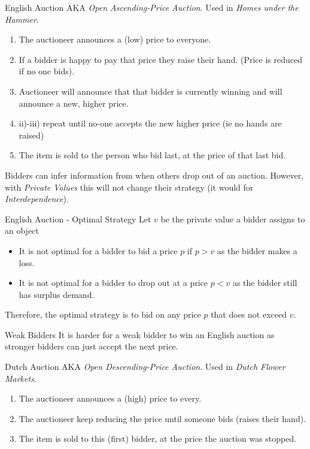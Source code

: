 \documentclass[11pt,a4paper]{article}
\begin{document}
\begin{definition}{English Auction}
  AKA \textit{Open Ascending-Price Auction}. Used in \textit{Homes under the Hammer}.
  \begin{enumerate}
    \item The auctioneer announces a (low) price to everyone.
    \item If a bidder is happy to pay that price they raise their hand. (Price is reduced if no one bids).
    \item Auctioneer will announce that that bidder is currently winning and will announce a new, higher price.
    \item ii)-iii) repeat until no-one accepts the new higher price (ie no hands are raised)
    \item The item is sold to the person who bid last, at the price of that last bid.
  \end{enumerate}
  Bidders can infer information from when others drop out of an auction. However, with \textit{Private Values} this will not change their strategy (it would for \textit{Interdependence}).
\end{definition}

\begin{proposition}{English Auction - Optimal Strategy}
  Let $v$ be the private value a bidder assigns to an object
  \begin{itemize}
    \item It is not optimal for a bidder to bid a price $p$ if $p>v$ as the bidder makes a loss.
    \item It is not optimal for a bidder to drop out at a price $p<v$ as the bidder still has surplus demand.
  \end{itemize}
  Therefore, the optimal strategy is to bid on any price $p$ that does not exceed $v$.
\end{proposition}

\begin{remark}{Weak Bidders}
  It is harder for a weak bidder to win an English auction as stronger bidders can just accept the next price.
\end{remark}

\begin{definition}{Dutch Auction}
  AKA \textit{Open Descending-Price Auction}. Used in \textit{Dutch Flower Markets}.
  \begin{enumerate}
    \item The auctioneer announces a (high) price to every.
    \item The auctioneer keep reducing the price until someone bids (raises their hand).
    \item The item is sold to this (first) bidder, at the price the auction was stopped.
  \end{enumerate}
\end{definition}
\end{document}

